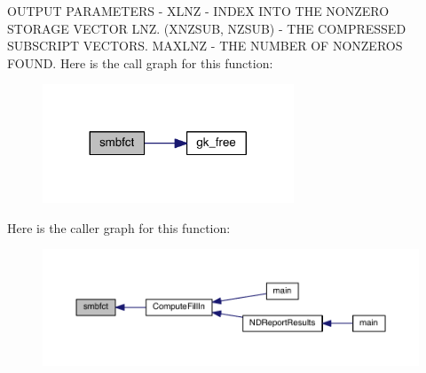 O\+U\+T\+P\+UT P\+A\+R\+A\+M\+E\+T\+E\+RS -\/ X\+L\+NZ -\/ I\+N\+D\+EX I\+N\+TO T\+HE N\+O\+N\+Z\+E\+RO S\+T\+O\+R\+A\+GE V\+E\+C\+T\+OR L\+NZ. (X\+N\+Z\+S\+UB, N\+Z\+S\+UB) -\/ T\+HE C\+O\+M\+P\+R\+E\+S\+S\+ED S\+U\+B\+S\+C\+R\+I\+PT V\+E\+C\+T\+O\+RS. M\+A\+X\+L\+NZ -\/ T\+HE N\+U\+M\+B\+ER OF N\+O\+N\+Z\+E\+R\+OS F\+O\+U\+ND. Here is the call graph for this function\+:\nopagebreak
\begin{figure}[H]
\begin{center}
\leavevmode
\includegraphics[width=212pt]{a00329_a4c231449fdf45c79d8d5107ad63b3451_cgraph}
\end{center}
\end{figure}
Here is the caller graph for this function\+:\nopagebreak
\begin{figure}[H]
\begin{center}
\leavevmode
\includegraphics[width=350pt]{a00329_a4c231449fdf45c79d8d5107ad63b3451_icgraph}
\end{center}
\end{figure}
